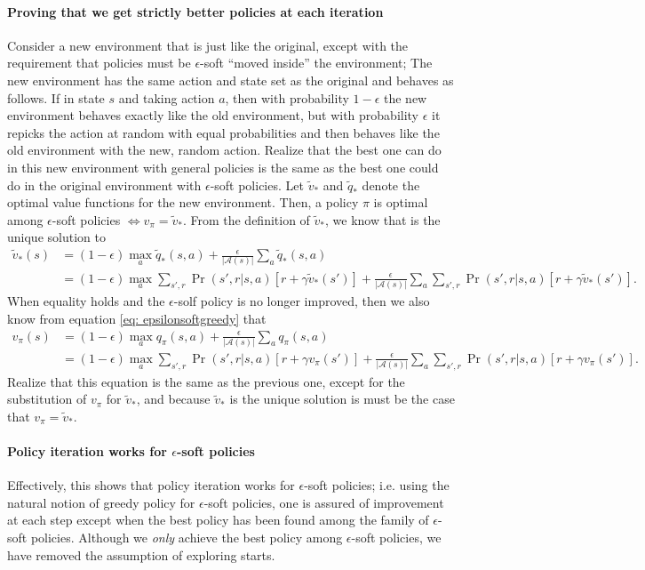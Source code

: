 \documentclass[12pt]{article}
\begin{document}
\paragraph{Proving that we get strictly better policies at each iteration}
Consider a new environment that is just like the original, except with the requirement that policies must be $\epsilon$-soft ``moved inside'' the environment; The new environment has the same action and state set as the original and behaves as follows. If in state $s$ and taking action $a$, then with probability $1-\epsilon$ the new environment behaves exactly like the old environment, but with probability $\epsilon$ it repicks the action at random with equal probabilities and then behaves like the old environment with the new, random action. Realize that the best one can do in this new environment with general policies is the same as the best one could do in the original environment with $\epsilon$-soft policies. Let $\tilde v_*$ and $\tilde q_*$ denote the optimal value functions for the new environment. Then, a policy $\pi$ is optimal among $\epsilon$-soft policies $\iff v_\pi = \tilde v_*$. From the definition of $\tilde v_*$, we know that is the unique solution to
\begin{align*}
  \tilde v_*(s) &= (1-\epsilon) \max_a \tilde q_*(s,a) +                   \frac{\epsilon}{|\mathcal A(s)|} \sum_a \tilde q_*(s,a) \\
                &= (1-\epsilon) \max_a \sum_{s',r} \Pr(s',r|s,a) \left[ r + \gamma \tilde v_*(s')\right] + \frac{\epsilon}{|\mathcal A(s)|} \sum_a \sum_{s',r} \Pr(s', r | s, a) \left[ r + \gamma \tilde v_*(s')\right].
\end{align*}
When equality holds and the $\epsilon$-solf policy is no longer improved, then we also know from equation \ref{eq: epsilonsoftgreedy} that
\begin{align*}
  v_\pi(s) &= (1-\epsilon) \max_a q_\pi(s,a) + \frac{\epsilon}{|\mathcal A(s)|}              \sum_a q_\pi(s,a) \\
           &= (1-\epsilon) \max_a \sum_{s',r} \Pr(s',r|s,a) \left[r + \gamma v_\pi(s')\right] + \frac{\epsilon}{|\mathcal A(s)|} \sum_a \sum_{s',r} \Pr(s',r|s,a)\left[r + \gamma v_\pi(s')\right].
\end{align*}
Realize that this equation is the same as the previous one, except for the substitution of $v_\pi$ for $\tilde v_*$, and because $\tilde v_*$ is the unique solution is must be the case that $v_\pi = \tilde v_*$.

\paragraph{Policy iteration works for $\epsilon$-soft policies}
Effectively, this shows that policy iteration works for $\epsilon$-soft policies; i.e. using the natural notion of greedy policy for $\epsilon$-soft policies, one is assured of improvement at each step except when the best policy has been found among the family of $\epsilon$-soft policies. Although we \emph{only} achieve the best policy among $\epsilon$-soft policies,
we have removed the assumption of exploring starts.
\end{document}
